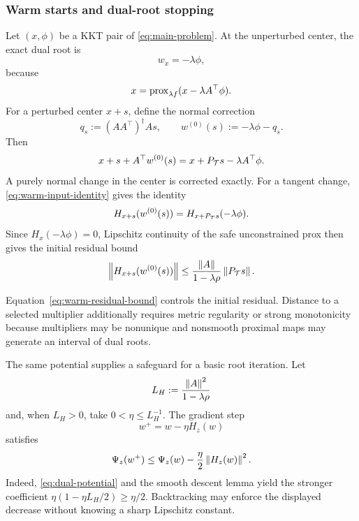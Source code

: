 \subsubsection{Warm starts and dual-root stopping}

Let \((x,\phi)\) be a KKT pair of \cref{eq:main-problem}.  At the unperturbed
center, the exact dual root is
\begin{equation}
  w_x=-\lambda\phi,
  \label{eq:centered-warm-start}
\end{equation}
because
\[
  x=\operatorname{prox}_{\lambda f}(x-\lambda A^\top\phi).
\]
For a perturbed center \(x+s\), define the normal correction
\begin{equation}
  q_s:=(AA^\top)^\dagger As,
  \qquad
  w^{(0)}(s):=-\lambda\phi-q_s.
  \label{eq:normal-corrected-warm}
\end{equation}
Then
\begin{equation}
  x+s+A^\top w^{(0)}(s)
  =
  x+P_{\mathcal{T}}s-\lambda A^\top\phi.
  \label{eq:warm-input-identity}
\end{equation}
A purely normal change in the center is corrected exactly.  For a tangent
change, \cref{eq:warm-input-identity} gives the identity
\begin{equation}
  H_{x+s}(w^{(0)}(s))
  =
  H_{x+P_{\mathcal{T}}s}(-\lambda\phi).
  \label{eq:warm-residual-identity}
\end{equation}
Since \(H_x(-\lambda\phi)=0\), Lipschitz continuity of the safe
unconstrained prox then gives the initial residual bound
\begin{equation}
  \left\lVert H_{x+s}(w^{(0)}(s))\right\rVert
  \le
  \frac{\left\lVert A\right\rVert}{1-\lambda\rho}
  \left\lVert P_{\mathcal{T}}s\right\rVert.
  \label{eq:warm-residual-bound}
\end{equation}

\begin{remark}
  Equation~\eqref{eq:warm-residual-bound} controls the initial residual.
  Distance to a selected multiplier additionally requires metric regularity
  or strong monotonicity because multipliers may be nonunique and nonsmooth
  proximal maps may generate an interval of dual roots.
\end{remark}

The same potential supplies a safeguard for a basic root iteration.  Let
\[
  L_H:=\frac{\left\lVert A\right\rVert^2}{1-\lambda\rho}
\]
and, when \(L_H>0\), take \(0<\eta\le L_H^{-1}\).  The gradient step
\begin{equation}
  w^+=w-\eta H_z(w)
  \label{eq:dual-gradient-step}
\end{equation}
satisfies
\begin{equation}
  \Psi_z(w^+)
  \le
  \Psi_z(w)-\frac{\eta}{2}\left\lVert H_z(w)\right\rVert^2.
  \label{eq:dual-potential-descent}
\end{equation}
Indeed, \cref{eq:dual-potential} and the smooth descent lemma yield the
stronger coefficient
\(\eta(1-\eta L_H/2)\ge\eta/2\).  Backtracking may enforce the displayed
decrease without knowing a sharp Lipschitz constant.

